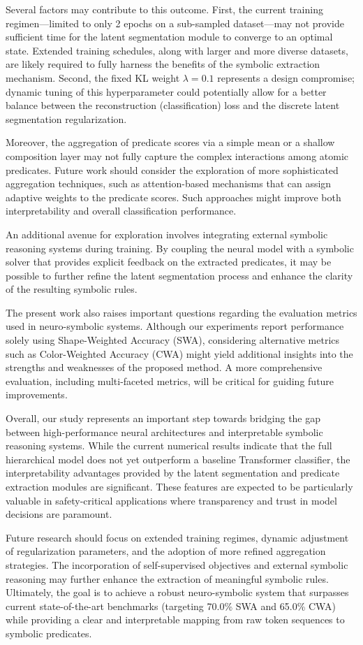 \documentclass{article}
\begin{document}
Several factors may contribute to this outcome. First, the current training regimen—limited to only 2 epochs on a sub-sampled dataset—may not provide sufficient time for the latent segmentation module to converge to an optimal state. Extended training schedules, along with larger and more diverse datasets, are likely required to fully harness the benefits of the symbolic extraction mechanism. Second, the fixed KL weight $\lambda=0.1$ represents a design compromise; dynamic tuning of this hyperparameter could potentially allow for a better balance between the reconstruction (classification) loss and the discrete latent segmentation regularization.

Moreover, the aggregation of predicate scores via a simple mean or a shallow composition layer may not fully capture the complex interactions among atomic predicates. Future work should consider the exploration of more sophisticated aggregation techniques, such as attention-based mechanisms that can assign adaptive weights to the predicate scores. Such approaches might improve both interpretability and overall classification performance.

An additional avenue for exploration involves integrating external symbolic reasoning systems during training. By coupling the neural model with a symbolic solver that provides explicit feedback on the extracted predicates, it may be possible to further refine the latent segmentation process and enhance the clarity of the resulting symbolic rules.

The present work also raises important questions regarding the evaluation metrics used in neuro-symbolic systems. Although our experiments report performance solely using Shape-Weighted Accuracy (SWA), considering alternative metrics such as Color-Weighted Accuracy (CWA) might yield additional insights into the strengths and weaknesses of the proposed method. A more comprehensive evaluation, including multi-faceted metrics, will be critical for guiding future improvements.

Overall, our study represents an important step towards bridging the gap between high-performance neural architectures and interpretable symbolic reasoning systems. While the current numerical results indicate that the full hierarchical model does not yet outperform a baseline Transformer classifier, the interpretability advantages provided by the latent segmentation and predicate extraction modules are significant. These features are expected to be particularly valuable in safety-critical applications where transparency and trust in model decisions are paramount.

Future research should focus on extended training regimes, dynamic adjustment of regularization parameters, and the adoption of more refined aggregation strategies. The incorporation of self-supervised objectives and external symbolic reasoning may further enhance the extraction of meaningful symbolic rules. Ultimately, the goal is to achieve a robust neuro-symbolic system that surpasses current state-of-the-art benchmarks (targeting 70.0\% SWA and 65.0\% CWA) while providing a clear and interpretable mapping from raw token sequences to symbolic predicates.
\end{document}
